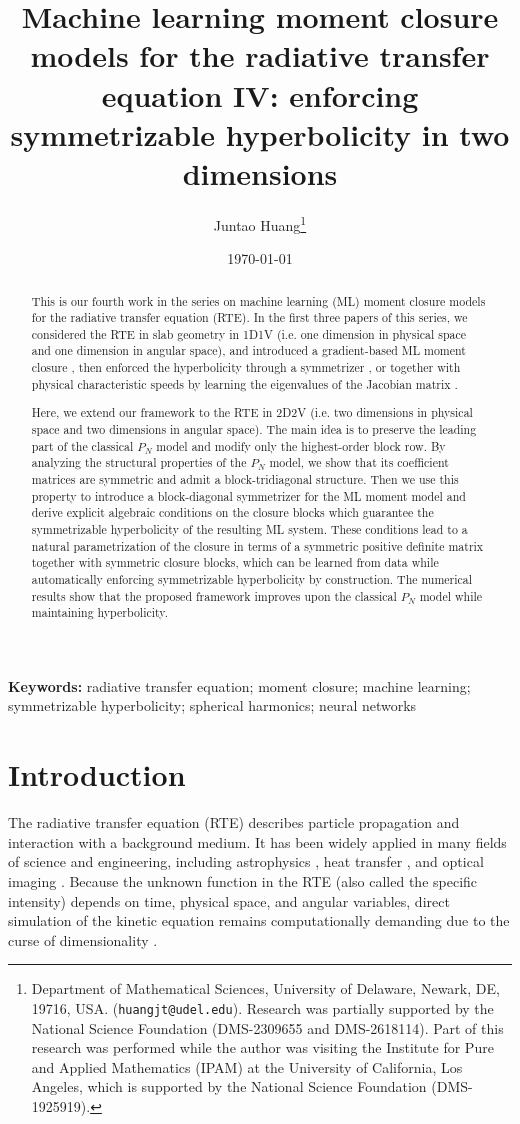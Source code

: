 \documentclass[11pt]{article}
\title{Machine learning moment closure models for the radiative transfer equation IV: enforcing symmetrizable hyperbolicity in two dimensions}
\author{Juntao Huang\thanks{Department of Mathematical Sciences, University of Delaware, Newark, DE, 19716, USA. (\texttt{huangjt@udel.edu}). Research was partially supported by the National Science Foundation (DMS-2309655 and DMS-2618114). Part of this research was performed while the author was visiting the Institute for Pure and Applied Mathematics (IPAM) at the University of California, Los Angeles, which is supported by the National Science Foundation (DMS-1925919).}}
\date{\today}
\numberwithin{equation}{section}
\begin{document}
\maketitle

\begin{abstract}
\normalsize

This is our fourth work in the series on machine learning (ML) moment closure models for the radiative transfer equation (RTE). 
In the first three papers of this series, we considered the RTE in slab geometry in 1D1V (i.e. one dimension in physical space and one dimension in angular space), and introduced a gradient-based ML moment closure \cite{huang2022mlmc1}, then enforced the hyperbolicity through a symmetrizer \cite{huang2021mlmc2}, or together with physical characteristic speeds by learning the eigenvalues of the Jacobian matrix \cite{huang2022mlmc3}.

Here, we extend our framework to the RTE in 2D2V (i.e. two dimensions in physical space and two dimensions in angular space). The main idea is to preserve the leading part of the classical $P_N$ model and modify only the highest-order block row. By analyzing the structural properties of the $P_N$ model, we show that its coefficient matrices are symmetric and admit a block-tridiagonal structure. Then we use this property to introduce a block-diagonal symmetrizer for the ML moment model and derive explicit algebraic conditions on the closure blocks which guarantee the symmetrizable hyperbolicity of the resulting ML system. These conditions lead to a natural parametrization of the closure in terms of a symmetric positive definite matrix together with symmetric closure blocks, which can be learned from data while automatically enforcing symmetrizable hyperbolicity by construction. The numerical results show that the proposed framework improves upon the classical $P_N$ model while maintaining hyperbolicity.
\end{abstract}

\noindent\textbf{Keywords:} radiative transfer equation; moment closure; machine learning; symmetrizable hyperbolicity; spherical harmonics; neural networks

\section{Introduction}


The radiative transfer equation (RTE) describes particle propagation and interaction with a background medium. It has been widely applied in many fields of science and engineering, including astrophysics \cite{pomraning2005equations}, heat transfer \cite{koch2004evaluation}, and optical imaging \cite{klose2002optical}.
Because the unknown function in the RTE (also called the specific intensity) depends on time, physical space, and angular variables, direct simulation of the kinetic equation remains computationally demanding due to the curse of dimensionality \cite{huang2024adaptive,peng2021reduced,einkemmer2025review}.
\end{document}

